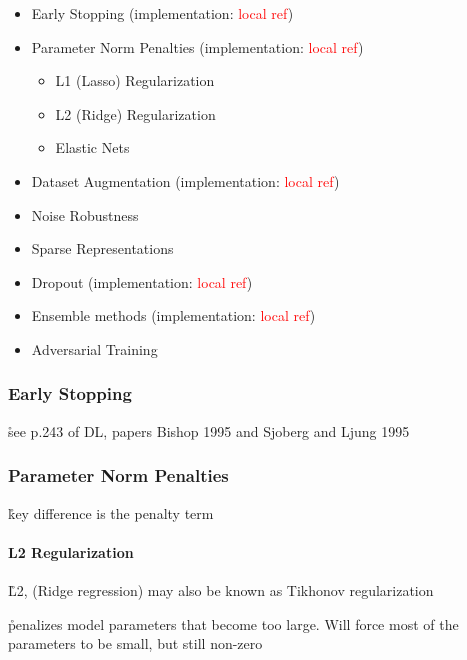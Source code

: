 \begin{itemize}[noitemsep,topsep=0pt]
	\item Early Stopping (implementation: \textcolor{red}{local ref})
	\item Parameter Norm Penalties (implementation: \textcolor{red}{local ref})
	\begin{itemize}[noitemsep,topsep=0pt]
		\item L1 (Lasso) Regularization
		\item L2 (Ridge) Regularization
		\item Elastic Nets
	\end{itemize}
	\item Dataset Augmentation (implementation: \textcolor{red}{local ref})
	\item Noise Robustness
	\item Sparse Representations
	\item Dropout (implementation: \textcolor{red}{local ref})
	\item Ensemble methods (implementation: \textcolor{red}{local ref})
	\item Adversarial Training
\end{itemize}


\subsubsection{Early Stopping}

\r{see p.243 of DL, papers Bishop 1995 and Sjoberg and Ljung 1995}


\subsubsection{Parameter Norm Penalties}

\r{key difference is the penalty term}


\paragraph{L2 Regularization}


\r{L2, ({Ridge regression}) may also be known as {Tikhonov regularization}}

\r{penalizes model parameters that become too large. Will force most of the parameters to be small, but still non-zero}

